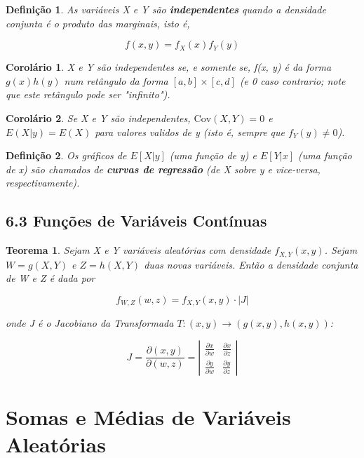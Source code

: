 \documentclass[12pt]{article}
\newtheorem{theorem}{Teorema}[section]
\newtheorem{corollary}{Corolário}[theorem]
\newtheorem{definition}{Definição}
\begin{document}
\begin{definition}
    As variáveis X e Y são \textbf{independentes} quando a densidade conjunta é o produto das marginais, isto é,
    
    $$f(x, y) = f_X (x) f_Y (y)$$
\end{definition}

\begin{corollary}
    X e Y são independentes se, e somente se, f(x, y) é da forma $g(x) h(y)$ num retângulo da forma $[a, b] \times [c, d]$ (e 0 caso contrario; note que este retângulo pode ser "infinito").
\end{corollary}

\begin{corollary}
    Se X e Y são independentes, $\text{Cov} (X, Y) = 0$ e $E(X | y) = E(X)$ para valores validos de y (isto é, sempre que $f_Y (y) \neq 0$).
\end{corollary}

\begin{definition}
    Os gráficos de $E[X|y]$ (uma função de y) e $E[Y|x]$ (uma função de x) são chamados de \textbf{curvas de regressão} (de X sobre y e vice-versa, respectivamente).
\end{definition}

\subsection*{6.3 Funções de Variáveis Contínuas}
\begin{theorem}
    Sejam X e Y variáveis aleatórias com densidade $f_{X, Y} (x, y)$. Sejam $W = g(X, Y)$ e $Z = h(X, Y)$ duas novas variáveis. Então a densidade conjunta de W e Z é dada por
    
    $$f_{W,Z} (w, z) = f_{X, Y} (x, y) \cdot |J|$$
    
    onde J é o Jacobiano da Transformada $T : (x, y) \rightarrow{} (g(x, y), h(x, y))$:
    
    $$J = \frac{\partial (x,y)}{\partial (w, z)} = \left | \begin{array}{cc}
        \frac{\partial x}{\partial w} & \frac{\partial x}{\partial z} \\
        \frac{\partial y}{\partial w} & \frac{\partial y}{\partial z}
    \end{array} \right |$$
\end{theorem}

\section{Somas e Médias de Variáveis Aleatórias}
\end{document}
